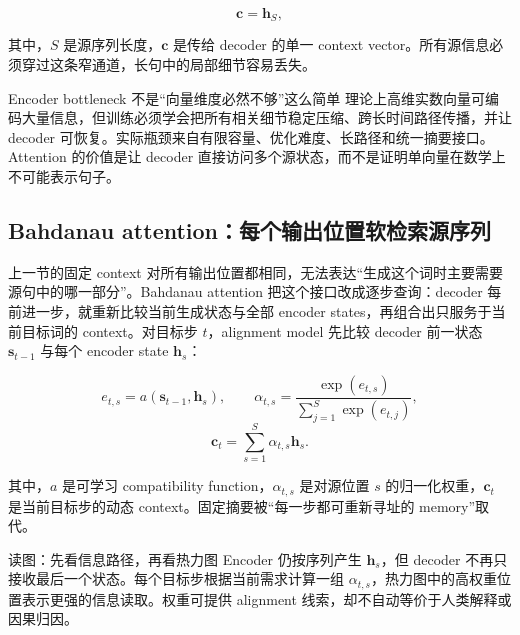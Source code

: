 \[
\mathbf c=\mathbf h_S,
\]

其中，$S$ 是源序列长度，$\mathbf c$ 是传给 decoder 的单一 context vector。所有源信息必须穿过这条窄通道，长句中的局部细节容易丢失。


\begin{warningbox}{Encoder bottleneck 不是“向量维度必然不够”这么简单}
理论上高维实数向量可编码大量信息，但训练必须学会把所有相关细节稳定压缩、跨长时间路径传播，并让 decoder 可恢复。实际瓶颈来自有限容量、优化难度、长路径和统一摘要接口。Attention 的价值是让 decoder 直接访问多个源状态，而不是证明单向量在数学上不可能表示句子。
\end{warningbox}

\subsection{Bahdanau attention：每个输出位置软检索源序列}

上一节的固定 context 对所有输出位置都相同，无法表达“生成这个词时主要需要源句中的哪一部分”。Bahdanau attention 把这个接口改成逐步查询：decoder 每前进一步，就重新比较当前生成状态与全部 encoder states，再组合出只服务于当前目标词的 context。对目标步 $t$，alignment model 先比较 decoder 前一状态 $\mathbf s_{t-1}$ 与每个 encoder state $\mathbf h_s$：

\[
e_{t,s}=a(\mathbf s_{t-1},\mathbf h_s),\qquad
\alpha_{t,s}=\frac{\exp(e_{t,s})}{\sum_{j=1}^{S}\exp(e_{t,j})},
\]
\[
\mathbf c_t=\sum_{s=1}^{S}\alpha_{t,s}\mathbf h_s.
\]

其中，$a$ 是可学习 compatibility function，$\alpha_{t,s}$ 是对源位置 $s$ 的归一化权重，$\mathbf c_t$ 是当前目标步的动态 context。固定摘要被“每一步都可重新寻址的 memory”取代。


\begin{knowledgebox}{读图：先看信息路径，再看热力图}
Encoder 仍按序列产生 $\mathbf h_s$，但 decoder 不再只接收最后一个状态。每个目标步根据当前需求计算一组 $\alpha_{t,s}$，热力图中的高权重位置表示更强的信息读取。权重可提供 alignment 线索，却不自动等价于人类解释或因果归因。
\end{knowledgebox}

